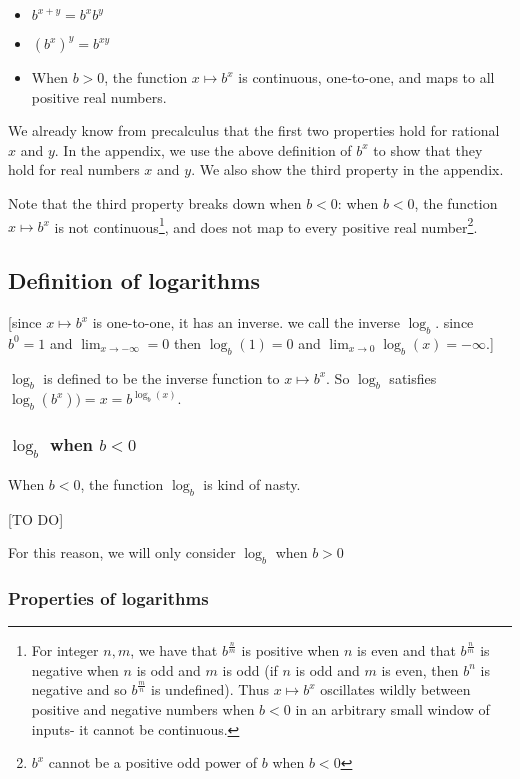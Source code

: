 \begin{itemize}
    \item $b^{x + y} = b^x b^y$
    \item $(b^x)^y = b^{xy}$
    \item When $b > 0$, the function $x \mapsto b^x$ is continuous, one-to-one, and maps to all positive real numbers.
\end{itemize}

We already know from precalculus that the first two properties hold for rational $x$ and $y$. In the appendix, we use the above definition of $b^x$ to show that they hold for real numbers $x$ and $y$. We also show the third property in the appendix.

Note that the third property breaks down when $b < 0$: when $b < 0$, the function $x \mapsto b^x$ is not continuous\footnote{For integer $n, m$, we have that $b^{\frac{n}{m}}$ is positive when $n$ is even and that $b^{\frac{n}{m}}$ is negative when $n$ is odd and $m$ is odd (if $n$ is odd and $m$ is even, then $b^n$ is negative and so $b^{\frac{m}{n}}$ is undefined). Thus $x \mapsto b^x$ oscillates wildly between positive and negative numbers when $b < 0$ in an arbitrary small window of inputs- it cannot be continuous.}, and does not map to every positive real number\footnote{$b^x$ cannot be a positive odd power of $b$ when $b < 0$}.

\subsection*{Definition of logarithms}

[since $x \mapsto b^x$ is one-to-one, it has an inverse. we call the inverse $\log_b$. since $b^0 = 1$ and $\lim_{x \rightarrow -\infty} = 0$ then $\log_b(1) = 0$ and $\lim_{x \rightarrow 0} \log_b(x) = - \infty$.]

$\log_b$ is defined to be the inverse function to $x \mapsto b^x$. So $\log_b$ satisfies $\log_b(b^x)) = x = b^{\log_b(x)}$.

\subsubsection*{$\log_b$ when $b < 0$}

When $b < 0$, the function $\log_b$ is kind of nasty.

[TO DO]

For this reason, we will only consider $\log_b$ when $b > 0$

\subsubsection*{Properties of logarithms}

